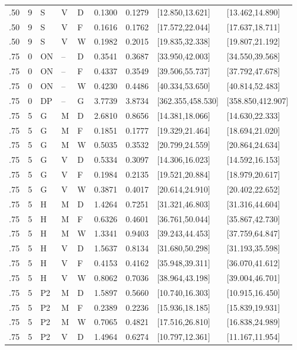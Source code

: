 {\begin{longtable}{rrlllrrll}
.50 & 9 & S & V & D & 0.1300 & 0.1279 & [12.850,13.621] & [13.462,14.890]\\
.50 & 9 & S & V & F & 0.1616 & 0.1762 & [17.572,22.044] & [17.637,18.711]\\
.50 & 9 & S & V & W & 0.1982 & 0.2015 & [19.835,32.338] & [19.807,21.192]\\
.75 & 0 & ON & -- & D & 0.3541 & 0.3687 & [33.950,42.003] & [34.550,39.568]\\
.75 & 0 & ON & -- & F & 0.4337 & 0.3549 & [39.506,55.737] & [37.792,47.678]\\
.75 & 0 & ON & -- & W & 0.4230 & 0.4486 & [40.334,53.650] & [40.814,52.483]\\
.75 & 0 & DP & -- & G & 3.7739 & 3.8734 & [362.355,458.530] & [358.850,412.907]\\
.75 & 5 & G & M & D & 2.6810 & 0.8656 & [14.381,18.066] & [14.630,22.333]\\
.75 & 5 & G & M & F & 0.1851 & 0.1777 & [19.329,21.464] & [18.694,21.020]\\
.75 & 5 & G & M & W & 0.5035 & 0.3532 & [20.799,24.559] & [20.864,24.634]\\
.75 & 5 & G & V & D & 0.5334 & 0.3097 & [14.306,16.023] & [14.592,16.153]\\
.75 & 5 & G & V & F & 0.1984 & 0.2135 & [19.521,20.884] & [18.979,20.617]\\
.75 & 5 & G & V & W & 0.3871 & 0.4017 & [20.614,24.910] & [20.402,22.652]\\
.75 & 5 & H & M & D & 1.4264 & 0.7251 & [31.321,46.803] & [31.316,44.604]\\
.75 & 5 & H & M & F & 0.6326 & 0.4601 & [36.761,50.044] & [35.867,42.730]\\
.75 & 5 & H & M & W & 1.3341 & 0.9403 & [39.243,44.453] & [37.759,64.847]\\
.75 & 5 & H & V & D & 1.5637 & 0.8134 & [31.680,50.298] & [31.193,35.598]\\
.75 & 5 & H & V & F & 0.4153 & 0.4162 & [35.948,39.311] & [36.070,41.612]\\
.75 & 5 & H & V & W & 0.8062 & 0.7036 & [38.964,43.198] & [39.004,46.701]\\
.75 & 5 & P2 & M & D & 1.5897 & 0.5660 & [10.740,16.303] & [10.915,16.450]\\
.75 & 5 & P2 & M & F & 0.2389 & 0.2236 & [15.936,18.185] & [15.839,19.931]\\
.75 & 5 & P2 & M & W & 0.7065 & 0.4821 & [17.516,26.810] & [16.838,24.989]\\
.75 & 5 & P2 & V & D & 1.4964 & 0.6274 & [10.797,12.361] & [11.167,11.954]\\

\end{longtable}}
